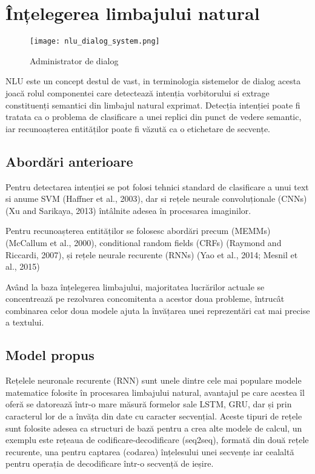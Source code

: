 \section{Înțelegerea limbajului natural}
\begin{figure}[h]
	\centering
	\texttt{[image: nlu\_dialog\_system.png]}
	\caption{Administrator de dialog}
	\label{fig:nlu_ds_proc}
\end{figure}
NLU este un concept destul de vast, in terminologia sistemelor de dialog acesta joacă rolul componentei care detectează intenția vorbitorului si extrage constituenți semantici din limbajul natural exprimat.
Detecția intenției poate fi tratata ca o problema de clasificare a unei replici din punct de vedere semantic, iar recunoașterea entităților poate fi văzută ca o etichetare de secvențe.
\subsection{Abordări anterioare}


Pentru detectarea intenției se pot folosi tehnici standard de clasificare a unui text si anume SVM (Haffner et al., 2003), dar si rețele neurale convoluționale (CNNs) (Xu and Sarikaya, 2013) întâlnite adesea în procesarea imaginilor.

Pentru recunoașterea entităților se folosesc abordări precum (MEMMs) (McCallum et al., 2000), conditional random fields (CRFs) (Raymond and Riccardi, 2007), și rețele neurale recurente (RNNs) (Yao et al., 2014; Mesnil et al., 2015)

Având la baza înțelegerea limbajului, majoritatea lucrărilor actuale se concentrează pe rezolvarea concomitenta a acestor doua probleme, întrucât combinarea celor doua modele ajuta la învățarea unei reprezentări cat mai precise a textului. \cite{joint models-attention models}


\subsection{Model propus}

Rețelele neuronale recurente (RNN) sunt unele dintre cele mai populare modele matematice folosite în procesarea limbajului natural, avantajul pe care acestea îl oferă se datorează într-o mare măsură formelor sale LSTM, GRU, dar și prin caracterul lor de a învăța din date cu caracter secvențial. Aceste tipuri de rețele sunt folosite adesea ca structuri de bază pentru a crea alte modele de calcul, un exemplu este rețeaua de codificare-decodificare (seq2seq), formată din două rețele recurente, una pentru captarea (codarea) înțelesului unei secvențe iar cealaltă pentru operația de decodificare într-o secvență de ieșire.

